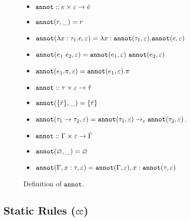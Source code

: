 \begin{figure}
\vspace*{-5mm}
\begin{itemize}
	\setlength\itemsep{-0.2em}
\item[] $\mathtt{annot} :: e \times \varepsilon \rightarrow \hat e$
	\item[] $\mathtt{annot}(r, \_) = r$
	\item[] $\mathtt{annot}(\lambda x: \tau_1 . e, \varepsilon) = \lambda x: \mathtt{annot}(\tau_1, \varepsilon) . \mathtt{annot}(e, \varepsilon)$
	\item[] $\mathtt{annot}(e_1~e_2, \varepsilon) = \mathtt{annot}(e_1, \varepsilon)~\mathtt{annot}(e_2, \varepsilon)$
	\item[] $\mathtt{annot}(e_1.\pi, \varepsilon) = \mathtt{annot}(e_1, \varepsilon).\pi$
\end{itemize}
	
\vspace{-5mm}

\begin{itemize}
	\setlength\itemsep{-0.2em}
\item[] $\mathtt{annot} :: \tau \times \varepsilon \rightarrow \hat \tau$
	\item[] $\mathtt{annot}(\{ \bar r \}, \_) = \{ \bar r \}$
	\item[] $\mathtt{annot}(\tau_1 \rightarrow \tau_2, \varepsilon) = \mathtt{annot}(\tau_1, \varepsilon) \rightarrow_{\varepsilon} \mathtt{annot}(\tau_2, \varepsilon)$.	
\end{itemize}

\vspace{-5mm}

\begin{itemize}
	\setlength\itemsep{-0.2em}
\item[] $\mathtt{annot} :: \Gamma \times \varepsilon \rightarrow \hat \Gamma$
	\item[] $\mathtt{annot}(\varnothing, \_) = \varnothing$
	\item[] $\mathtt{annot}(\Gamma, x: \tau, \varepsilon) = \mathtt{annot}(\Gamma, \varepsilon), x: \mathtt{annot}(\tau, \varepsilon)$
\end{itemize}
\vspace*{-5mm}
\caption{Definition of $\mathtt{annot}$.}
\vspace*{-5mm}
\label{fig:annot_defn}
\end{figure}

\subsection{Static Rules ($\mathtt{CC}$)}


